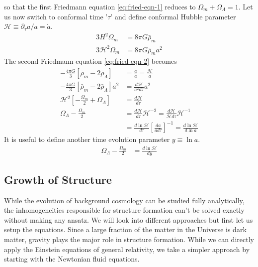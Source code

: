 \documentclass[12pt]{article}
\begin{document}
%
so that the first Friedmann equation \ref{eq:fried-eqn-1} reduces to $\Omega_{m} + \Omega_{\Lambda} = 1$. Let us now switch to conformal time '$\tau$' and define conformal Hubble parameter $\mathcal{H} \equiv \partial_\tau a / a = \dot{a}$.
\begin{align}
3 H^2 \Omega_{m} &= 8 \pi G \bar{\rho}_{m}\\
3 \mathcal{H}^2 \Omega_{m} &= 8 \pi G \bar{\rho}_{m} a^2 \label{eq:omega-m-relation}
\end{align}
The second Friedmann equation \eqref{eq:fried-eqn-2} becomes 
\begin{align}
- \frac{4\pi G}{3} \left[ \bar{\rho}_{m} - 2 \bar{\rho}_{\Lambda} \right] &=  \frac{\ddot{a}}{a} = \frac{\dot{\mathcal{H}}}{a}\\
- \frac{4\pi G}{3} \left[ \bar{\rho}_{m} - 2 \bar{\rho}_{\Lambda} \right] a^2 &= \frac{d \mathcal{H}}{a^2 d\tau} a^2\\
\label{eq:fried-eqn-2-simple}
\mathcal{H}^2 \left[ - \frac{\Omega_{m}}{2} + \Omega_{\Lambda} \right] &= \frac{d \mathcal{H}}{d\tau}\\
\Omega_{\Lambda} - \frac{\Omega_{m}}{2} &= \frac{d \mathcal{H}}{d\tau} \mathcal{H}^{-2} = \frac{d \mathcal{H}}{\mathcal{H} d\tau} \mathcal{H}^{-1}\\
&= \frac{d \ln \mathcal{H}}{d\tau}
\left[ \frac{da}{a d\tau} \right]^{-1} = \frac{d \ln \mathcal{H}}{d \ln a}
\end{align} 
It is useful to define another time evolution parameter $y \equiv \ln a$.
\begin{align}
\Omega_{\Lambda} - \frac{\Omega_{m}}{2} &= \frac{d \ln \mathcal{H}}{d y} 
\end{align}

\subsection{Growth of Structure}
While the evolution of background cosmology can be studied fully analytically, the inhomogeneities responsible for structure formation can't be solved exactly without making any ansatz. We will look into different approaches but first let us setup the equations. Since a large fraction of the matter in the Universe is dark matter, gravity plays the major role in structure formation. While we can directly apply the Einstein equations of general relativity, we take a simpler approach by starting with the Newtonian fluid equations.
\end{document}
